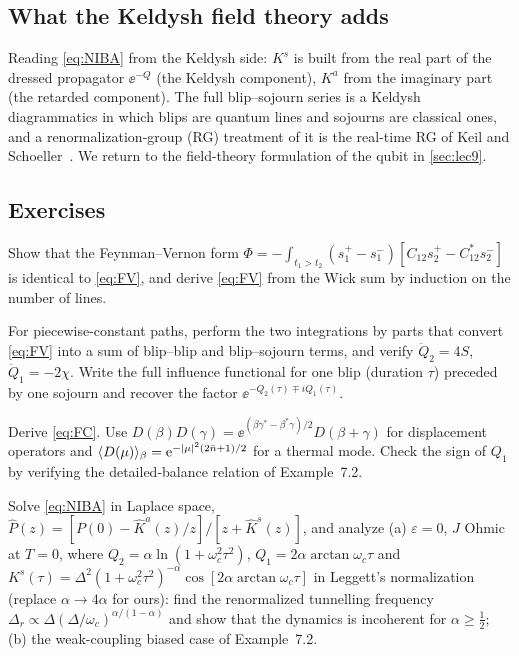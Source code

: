 \subsection{What the Keldysh field theory adds}

Reading \cref{eq:NIBA} from the Keldysh side: $K^s$ is built from the real part of the dressed propagator $\ee^{-Q}$ (the Keldysh component), $K^a$ from the imaginary part (the retarded component).
The full blip--sojourn series is a Keldysh diagrammatics in which blips are quantum lines and sojourns are classical ones, and a renormalization-group (RG) treatment of it is the real-time RG of Keil and Schoeller~\cite{Keil2001}.
We return to the field-theory formulation of the qubit in \cref{sec:lec9}.

\subsection{Exercises}

\begin{exercise}\label{ex:7-1}
Show that the Feynman--Vernon form $\Phi=-\int_{t_1>t_2}(s^+_1-s^-_1)[C_{12}s^+_2-C_{12}^*s^-_2]$ is identical to \cref{eq:FV}, and derive \cref{eq:FV} from the Wick sum by induction on the number of lines.
\end{exercise}

\begin{exercise}\label{ex:7-2}
For piecewise-constant paths, perform the two integrations by parts that convert \cref{eq:FV} into a sum of blip--blip and blip--sojourn terms, and verify $\ddot Q_2=4S$, $\ddot Q_1=-2\chi$.
Write the full influence functional for one blip (duration $\tau$) preceded by one sojourn and recover the factor $\ee^{-Q_2(\tau)\mp iQ_1(\tau)}$.
\end{exercise}

\begin{exercise}\label{ex:7-3}
Derive \cref{eq:FC}.
Use $D(\beta)D(\gamma)=\ee^{(\beta\gamma^*-\beta^*\gamma)/2}D(\beta+\gamma)$ for displacement operators and $\langle D(\mu)\rangle_\beta=\mathrm{e}^{-|\mu|^2(2\bar n+1)/2}$ for a thermal mode.
Check the sign of $Q_1$ by verifying the detailed-balance relation of Example~7.2.
\end{exercise}

\begin{exercise}\label{ex:7-4}
Solve \cref{eq:NIBA} in Laplace space, $\hat P(z)=[P(0)-\hat K^a(z)/z]/[z+\hat K^s(z)]$, and analyze (a) $\varepsilon=0$, $J$ Ohmic at $T=0$, where $Q_2=\alpha\ln(1+\omega_c^2\tau^2)$, $Q_1=2\alpha\arctan\omega_c\tau$ and $K^s(\tau)=\Delta^2(1+\omega_c^2\tau^2)^{-\alpha}\cos[2\alpha\arctan\omega_c\tau]$ in Leggett's normalization (replace $\alpha\to4\alpha$ for ours): find the renormalized tunnelling frequency $\Delta_r\propto\Delta(\Delta/\omega_c)^{\alpha/(1-\alpha)}$ and show that the dynamics is incoherent for $\alpha\ge\tfrac12$; (b) the weak-coupling biased case of Example~7.2.
\end{exercise}

